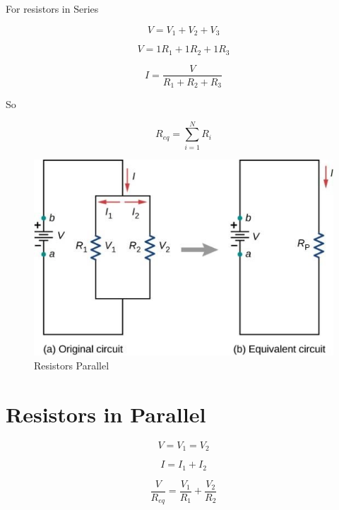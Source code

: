 \documentclass[14pt]{memoir}
\begin{document}
For resistors in Series

\begin{equation}
V = V_1 + V_2 + V_3
\end{equation}

\begin{equation}
V = 1R_1 + 1R_2 + 1R_3
\end{equation}

\begin{equation}
I = \frac{V}{R_1 + R_2 + R_3}
\end{equation}

So

\begin{equation}
R_{eq} = \sum_{i=1}^{N} R_i
\end{equation}

\begin{figure}[H]
\begin{center}
\includegraphics[scale=0.50]{fig/fig_10_14.jpg}
\caption{Resistors Parallel}
\label{fig:10_14}
\end{center}
\end{figure}

\section{Resistors in Parallel}

\begin{equation}
V = V_1 = V_2
\end{equation}

\begin{equation}
I = I_1 + I_2
\end{equation}

\begin{equation}
\frac{V}{R_{eq}} = \frac{V_1}{R_1} + \frac{V_2}{R_2}
\end{equation}
\end{document}
